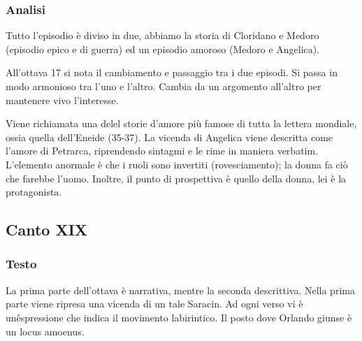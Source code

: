 \documentclass[a4paper]{article}
\begin{document}
\subsubsection{Analisi}

Tutto l'episodio è diviso in due,
abbiamo la storia di Cloridano e Medoro (episodio epico e di guerra)
ed un episodio amoroso (Medoro e Angelica).

All'ottava 17 si nota il cambiamento e passaggio tra i due episodi.
Si passa in modo armonioso tra l'uno e l'altro.
Cambia da un argomento all'altro per mantenere vivo l'interesse.

Viene richiamata una delel storie d'amore più famose di tutta la lettera mondiale,
ossia quella dell'Eneide (35-37).
La vicenda di Angelica viene descritta come l'amore di Petrarca, riprendendo sintagmi
e le rime in maniera verbatim.
L'elemento anormale è che i ruoli sono invertiti (rovesciamento); la donna
fa ciò che farebbe l'uomo. Inoltre, il punto di prospettiva è quello della donna,
lei è la protagonista.

\pagebreak

\subsection{Canto XIX}

\subsubsection{Testo}

\begin{center} %
\begin{minipage}{0.5\textwidth}
\centering
{}
\end{minipage}
\end{center}

La prima parte dell'ottava è narrativa, mentre la seconda descrittiva.
Nella prima parte viene ripresa una vicenda di un tale Saracin.
Ad ogni verso vi è unêspressione che indica il movimento labirintico.
Il posto dove Orlando giunse è un locus amoenus.
\end{document}
